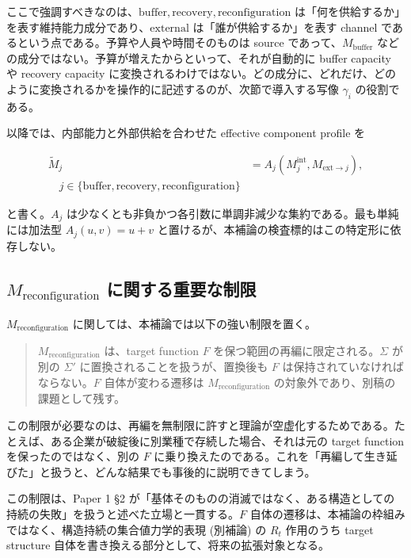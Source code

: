 \documentclass[12pt,a4paper]{article}
\begin{document}
ここで強調すべきなのは、\(\mathrm{buffer},\mathrm{recovery},\mathrm{reconfiguration}\) は「何を供給するか」を表す維持能力成分であり、\(\mathrm{external}\) は「誰が供給するか」を表す channel であるという点である。予算や人員や時間そのものは source であって、\(M_{\mathrm{buffer}}\) などの成分ではない。予算が増えたからといって、それが自動的に buffer capacity や recovery capacity に変換されるわけではない。どの成分に、どれだけ、どのように変換されるかを操作的に記述するのが、次節で導入する写像 \(\gamma_i\) の役割である。

以降では、内部能力と外部供給を合わせた effective component profile を

\[
\begin{aligned}
\widetilde M_{j} &= A_{j}(M_{j}^{\mathrm{int}}, M_{\mathrm{ext}\to j}), \\
\quad j \in \{\mathrm{buffer},\mathrm{recovery},\mathrm{reconfiguration}\}
\end{aligned}
\]

と書く。\(A_j\) は少なくとも非負かつ各引数に単調非減少な集約である。最も単純には加法型 \(A_j(u,v)=u+v\) と置けるが、本補論の検査標的はこの特定形に依存しない。

\subsection{\texorpdfstring{\(M_{\mathrm{reconfiguration}}\) に関する重要な制限}{M\_\{\textbackslash mathrm\{reconfiguration\}\} に関する重要な制限}}\label{m_mathrmreconfiguration-ux306bux95a2ux3059ux308bux91cdux8981ux306aux5236ux9650}

\(M_{\mathrm{reconfiguration}}\) に関しては、本補論では以下の強い制限を置く。

\begin{quote}
$M_{\mathrm{reconfiguration}}$ は、target function $F$ を保つ範囲の再編に限定される。$\Sigma$ が別の $\Sigma'$ に置換されることを扱うが、置換後も $F$ は保持されていなければならない。$F$ 自体が変わる遷移は $M_{\mathrm{reconfiguration}}$ の対象外であり、別稿の課題として残す。
\end{quote}

この制限が必要なのは、再編を無制限に許すと理論が空虚化するためである。たとえば、ある企業が破綻後に別業種で存続した場合、それは元の target function を保ったのではなく、別の \(F\) に乗り換えたのである。これを「再編して生き延びた」と扱うと、どんな結果でも事後的に説明できてしまう。

この制限は、Paper 1 §2 が「基体そのものの消滅ではなく、ある構造としての持続の失敗」を扱うと述べた立場と一貫する。\(F\) 自体の遷移は、本補論の枠組みではなく、構造持続の集合値力学的表現 (別補論) の \(R_t\) 作用のうち target structure 自体を書き換える部分として、将来の拡張対象となる。
\end{document}
